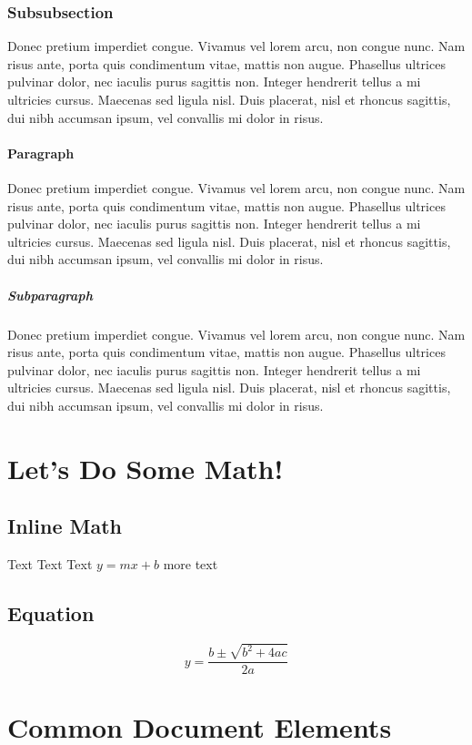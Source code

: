 \documentclass{article}
\begin{document}
\subsubsection{Subsubsection}
Donec pretium imperdiet congue. Vivamus vel lorem arcu, non congue nunc. Nam
risus ante, porta quis condimentum vitae, mattis non augue. Phasellus ultrices
pulvinar dolor, nec iaculis purus sagittis non. Integer hendrerit tellus a mi
ultricies cursus. Maecenas sed ligula nisl. Duis placerat, nisl et rhoncus
sagittis, dui nibh accumsan ipsum, vel convallis mi dolor in risus.

\paragraph{Paragraph}
Donec pretium imperdiet congue. Vivamus vel lorem arcu, non congue nunc. Nam
risus ante, porta quis condimentum vitae, mattis non augue. Phasellus ultrices
pulvinar dolor, nec iaculis purus sagittis non. Integer hendrerit tellus a mi
ultricies cursus. Maecenas sed ligula nisl. Duis placerat, nisl et rhoncus
sagittis, dui nibh accumsan ipsum, vel convallis mi dolor in risus.

\subparagraph{Subparagraph}
Donec pretium imperdiet congue. Vivamus vel lorem arcu, non congue nunc. Nam
risus ante, porta quis condimentum vitae, mattis non augue. Phasellus ultrices
pulvinar dolor, nec iaculis purus sagittis non. Integer hendrerit tellus a mi
ultricies cursus. Maecenas sed ligula nisl. Duis placerat, nisl et rhoncus
sagittis, dui nibh accumsan ipsum, vel convallis mi dolor in risus.

\section{Let's Do Some Math!}

\subsection{Inline Math}
Text Text Text $y = mx + b$ more text

\subsection{Equation}

\begin{equation}
y = \frac{b \pm \sqrt{b^{2} + 4ac}}{2a}
\end{equation}


\section{Common Document Elements}
\end{document}
